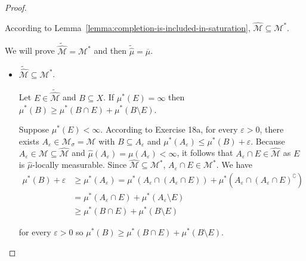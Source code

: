 \begin{proof}
\begin{enumerate}[itemsep=0pt,label=\textbf{\alph*.}]
              According to Lemma~\ref{lemma:completion-is-included-in-saturation}, \( \widehat{\mathcal{M}} \subseteq \mathcal{M}^{\ast} \).

              We will prove \( \widetilde{\widehat{\mathcal{M}}} = \mathcal{M}^{\ast} \) and then \( \widetilde{\widehat{\mu}} = \overline{\mu} \).

              \begin{itemize}
                  \item \( \widetilde{\widehat{\mathcal{M}}} \subseteq \mathcal{M}^{\ast} \).

                        Let \( E \in \widetilde{\widehat{\mathcal{M}}} \) and \( B \subseteq X \). If \( \mu^{\ast}(E) = \infty \) then \( \mu^{\ast}(B) \ge \mu^{\ast}(B \cap E) + \mu^{\ast}(B \setminus E) \).

                        Suppose \( \mu^{\ast}(E) < \infty \). According to Exercise 18a, for every \( \varepsilon > 0 \), there exists \( A_{\varepsilon} \in \mathcal{M}_{\sigma} = \mathcal{M} \) with \( B \subseteq A_{\varepsilon} \) and \( \mu^{\ast}(A_{\varepsilon}) \le \mu^{\ast}(B) + \varepsilon \). Because \( A_{\varepsilon} \in \mathcal{M} \subseteq \widehat{\mathcal{M}} \) and \( \widehat{\mu}(A_{\varepsilon}) = \mu(A_{\varepsilon}) < \infty \), it follows that \( A_{\varepsilon} \cap E \in \widehat{\mathcal{M}} \) as \( E \) is \( \widehat{\mu} \)-locally measurable. Since \( \widehat{\mathcal{M}} \subseteq \mathcal{M}^{\ast} \), \( A_{\varepsilon} \cap E \in \mathcal{M}^{\ast} \). We have
                        \begingroup
                        \allowdisplaybreaks%
                        \begin{align*}
                            \mu^{\ast}(B) + \varepsilon & \ge \mu^{\ast}(A_{\varepsilon}) = \mu^{\ast}(A_{\varepsilon} \cap (A_{\varepsilon} \cap E)) + \mu^{\ast}(A_{\varepsilon} \cap {(A_{\varepsilon} \cap E)}^{\complement}) \\
                                                        & = \mu^{\ast}(A_{\varepsilon} \cap E) + \mu^{\ast}(A_{\varepsilon} \setminus E)                                                                                          \\
                                                        & \ge \mu^{\ast}(B \cap E) + \mu^{\ast}(B \setminus E)
                        \end{align*}
                        \endgroup

                        for every \( \varepsilon > 0 \) so \( \mu^{\ast}(B) \ge \mu^{\ast}(B \cap E) + \mu^{\ast}(B \setminus E) \).


\end{itemize}
\end{enumerate}
\end{proof}
